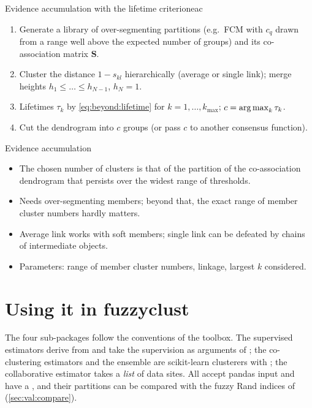 \begin{algobox}{Evidence accumulation with the lifetime criterion}{eac}
\begin{enumerate}[leftmargin=*]
  \item Generate a library of over-segmenting partitions (e.g.\ FCM with $c_q$ drawn from a range well above the expected number of groups) and its co-association matrix $\mathbf{S}$.
  \item Cluster the distance $1-s_{kl}$ hierarchically (average or single link); merge heights $h_1\le\dots\le h_{N-1}$, $h_N=1$.
  \item Lifetimes $\tau_k$ by \eqref{eq:beyond:lifetime} for $k=1,\dots,k_{\max}$; $c=\operatorname{arg\,max}_k\tau_k$.
  \item Cut the dendrogram into $c$ groups (or pass $c$ to another consensus function).
\end{enumerate}
\end{algobox}
\begin{summarybox}{Evidence accumulation}
\begin{itemize}
  \item The chosen number of clusters is that of the partition of the co-association dendrogram that persists over the widest range of thresholds.
  \item Needs over-segmenting members; beyond that, the exact range of member cluster numbers hardly matters.
  \item Average link works with soft members; single link can be defeated by chains of intermediate objects.
  \item Parameters: range of member cluster numbers, linkage, largest $k$ considered.
\end{itemize}
\end{summarybox}

\section{Using it in fuzzyclust}\label{sec:beyond:api}

The four sub-packages follow the conventions of the toolbox. The supervised estimators derive from  and take the supervision as arguments of ; the co-clustering estimators and the ensemble are scikit-learn clusterers with ; the collaborative estimator takes a \emph{list} of data sites. All accept pandas input and have a , and their partitions can be compared with the fuzzy Rand indices of  (\cref{sec:val:compare}).

